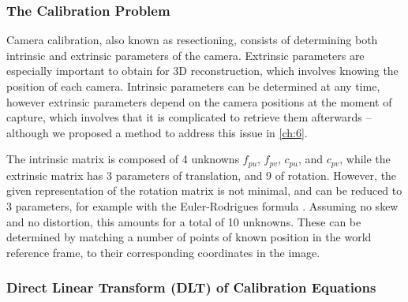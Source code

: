 \subsubsection{The Calibration Problem}

Camera calibration, also known as resectioning, consists of determining both intrinsic and extrinsic parameters of the camera. Extrinsic parameters are especially important to obtain for 3D reconstruction, which involves knowing the position of each camera. Intrinsic parameters can be determined at any time, however extrinsic parameters depend on the camera positions at the moment of capture, which involves that it is complicated to retrieve them afterwards -- although we proposed a method to address this issue in \autoref{ch:6}.

The intrinsic matrix is composed of 4 unknowns $f_{pu}$, $f_{pv}$, $c_{pu}$, and $c_{pv}$, while the extrinsic matrix has 3 parameters of translation, and 9 of rotation. However, the given representation of the rotation matrix is not minimal, and can be reduced to 3 parameters, for example with the Euler-Rodrigues formula \cite{Gallego2015}. Assuming no skew and no distortion, this amounts for a total of 10 unknowns. These can be determined by matching a number of points of known position in the world reference frame, to their corresponding coordinates in the image. 

\subsubsection{Direct Linear Transform (DLT) of Calibration Equations}

